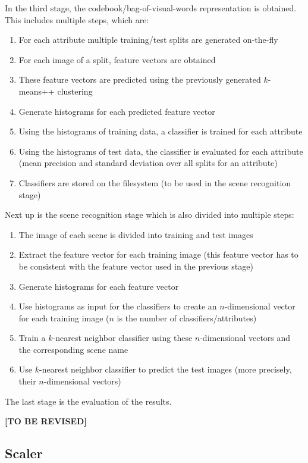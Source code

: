 \documentclass{vldb}
\newcommand{\tbr}{{\color{red}\textbf{[TO BE REVISED]}}}
\begin{document}
In the third stage, the codebook/bag-of-visual-words representation is obtained.
This includes multiple steps, which are: 
\begin{enumerate}
  \item For each attribute multiple training/test splits are generated on-the-fly
  \item For each image of a split, feature vectors are obtained
  \item These feature vectors are predicted using the previously generated
    $k$-means++ clustering
  \item Generate histograms for each predicted feature vector
  \item Using the histograms of training data, a classifier is trained for each
    attribute
  \item Using the histograms of test data, the classifier is evaluated for each
    attribute (mean precision and standard deviation over all splits for an
    attribute)
  \item Classifiers are stored on the filesystem (to be used in the scene
    recognition stage)
\end{enumerate}

Next up is the scene recognition stage which is also divided into multiple steps:
\begin{enumerate}
  \item The image of each scene is divided into training and test images
  \item Extract the feature vector for each training image (this feature vector
    has to be consistent with the feature vector used in the previous stage)
  \item Generate histograms for each feature vector 
  \item Use histograms as input for the classifiers to create an $n$-dimensional
    vector for each training image ($n$ is the number of classifiers/attributes)
  \item Train a $k$-nearest neighbor classifier using these $n$-dimensional
    vectors and the corresponding scene name
  \item Use $k$-nearest neighbor classifier to predict the test images (more
    precisely, their $n$-dimensional vectors)
\end{enumerate}

The last stage is the evaluation of the results.

\tbr

\subsection{Scaler}
\label{subsec:scaler}
\end{document}
